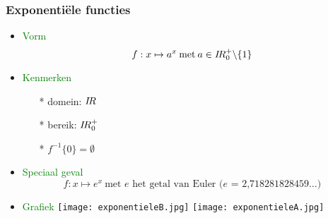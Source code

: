 \subsubsection{Exponenti\"ele functies} \label{exponentiele functies}
		\begin{itemize}%
		\item \textcolor{green}{Vorm}\newline
		\[f: x \mapsto a^x \:\mbox{met}\: a\in \mbox{$I\!R$}^+_0\backslash \{1\}\]
		\item \textcolor{green}{Kenmerken}
			\begin{itemize}
			\item[*] domein: $\mbox{$I\!R$}$
			\item[*] bereik: $\mbox{$I\!R$}^+_0$
			\item[*] $f^{-1}\{0\} = \emptyset$
			\end{itemize}
		\item \textcolor{green}{Speciaal geval}\newline
		\[f: x \mapsto e^x \:\mbox{met $e$ het getal van Euler ($e$ = 		2,718281828459$\ldots$)}\]
		\item \textcolor{green}{Grafiek}\newline
                \texttt{[image: exponentieleB.jpg]}
                \texttt{[image: exponentieleA.jpg]}
		\end{itemize}%

\hypertarget{logaritmische_functies}{}
